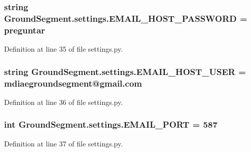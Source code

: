 \subsubsection[{E\+M\+A\+I\+L\+\_\+\+H\+O\+S\+T\+\_\+\+P\+A\+S\+S\+W\+O\+R\+D}]{\setlength{\rightskip}{0pt plus 5cm}string Ground\+Segment.\+settings.\+E\+M\+A\+I\+L\+\_\+\+H\+O\+S\+T\+\_\+\+P\+A\+S\+S\+W\+O\+R\+D = \textquotesingle{}preguntar\textquotesingle{}}\label{namespace_ground_segment_1_1settings_aedd7c143f3020b0a1156e678dc353726}


Definition at line 35 of file settings.\+py.

\hypertarget{namespace_ground_segment_1_1settings_a0bc4395f3eefc35a5ad7741002256650}{}
\subsubsection[{E\+M\+A\+I\+L\+\_\+\+H\+O\+S\+T\+\_\+\+U\+S\+E\+R}]{\setlength{\rightskip}{0pt plus 5cm}string Ground\+Segment.\+settings.\+E\+M\+A\+I\+L\+\_\+\+H\+O\+S\+T\+\_\+\+U\+S\+E\+R = \textquotesingle{}mdiaegroundsegment@gmail.\+com\textquotesingle{}}\label{namespace_ground_segment_1_1settings_a0bc4395f3eefc35a5ad7741002256650}


Definition at line 36 of file settings.\+py.

\hypertarget{namespace_ground_segment_1_1settings_af36bc449cf8894642e0ceabe6b668810}{}
\subsubsection[{E\+M\+A\+I\+L\+\_\+\+P\+O\+R\+T}]{\setlength{\rightskip}{0pt plus 5cm}int Ground\+Segment.\+settings.\+E\+M\+A\+I\+L\+\_\+\+P\+O\+R\+T = 587}\label{namespace_ground_segment_1_1settings_af36bc449cf8894642e0ceabe6b668810}


Definition at line 37 of file settings.\+py.

\hypertarget{namespace_ground_segment_1_1settings_a8f145226f6aaa8becf7066ef790b389b}{}
